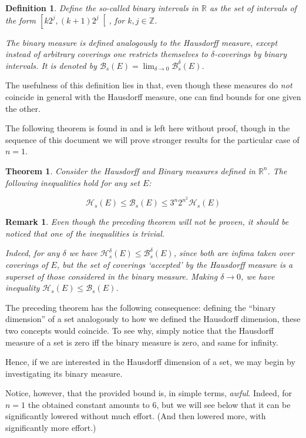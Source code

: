 \documentclass[11pt]{amsart}
\newcommand{\R}{\mathbb{R}}
\newcommand{\Z}{\mathbb{Z}}
\newcommand{\HH}{\mathcal{H}}
\newcommand{\BB}{\mathcal{B}}
\newtheorem{theorem}{Theorem}
\newtheorem{definition}{Definition}
\newtheorem*{remark}{Remark}
\begin{document}
\begin{definition}
Define the so-called \emph{binary intervals} in $\R$ as the set of intervals of the form $\left[ k 2^j, (k+1) 2^j \right[$, for $k, j \in \Z$.

The binary measure is defined analogously to the Hausdorff measure, except instead of arbitrary coverings one restricts themselves to $\delta$-coverings by binary intervals. It is denoted by $\BB_s(E) = \lim_{\delta \to 0} \BB_s^\delta(E)$.
\end{definition}

The usefulness of this definition lies in that, even though these measures do \emph{not} coincide in general with the Hausdorff measure, one can find bounds for one given the other.

The following theorem is found in \cite{falconer} \cite{rogers} and is left here without proof, though in the sequence of this document we will prove stronger results for the particular case of $n = 1$.

\begin{theorem}\label{badbound}
Consider the Hausdorff and Binary measures defined in $\R^n$. The following inequalities hold for any set $E$:

\[ \HH_s(E) \leq \BB_s(E) \leq 3^n 2^{n^2} \HH_s(E) \]
\end{theorem}

\begin{remark}
Even though the preceding theorem will not be proven, it should be noticed that one of the inequalities is trivial.

Indeed, for any $\delta$ we have $\HH_s^\delta(E) \leq \BB_s^\delta(E)$, since both are infima taken over coverings of $E$, but the set of coverings `accepted' by the Hausdorff measure is a superset of those considered in the binary measure. Making $\delta \to 0$, we have inequality $\HH_s(E) \leq \BB_s(E)$.
\end{remark}

The preceding theorem has the following consequence: defining the ``binary dimension'' of a set analogously to how we defined the Hausdorff dimension, these two concepts would coincide. To see why, simply notice that the Hausdorff measure of a set is zero iff the binary measure is zero, and same for infinity.

Hence, if we are interested in the Hausdorff dimension of a set, we may begin by investigating its binary measure.

Notice, however, that the provided bound is, in simple terms, \emph{awful}. Indeed, for $n = 1$ the obtained constant amounts to 6, but we will see below that it can be significantly lowered without much effort. (And then lowered more, with significantly more effort.)
\end{document}
